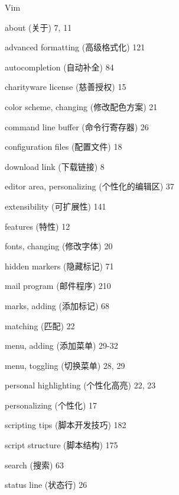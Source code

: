 \begin{multicols}{2}
\hangindent=2pc  Vim \par
\hangindent=2pc \quad about (关于) 7, 11 \par
\hangindent=2pc \quad advanced formatting (高级格式化) 121 \par
\hangindent=2pc \quad autocompletion (自动补全) 84 \par
\hangindent=2pc \quad charityware license (慈善授权) 15 \par
\hangindent=2pc \quad color scheme, changing (修改配色方案) 21 \par
\hangindent=2pc \quad command line buffer (命令行寄存器) 26 \par
\hangindent=2pc \quad configuration files (配置文件) 18 \par
\hangindent=2pc \quad download link (下载链接) 8 \par
\hangindent=2pc \quad editor area, personalizing (个性化的编辑区) 37 \par
\hangindent=2pc \quad extensibility (可扩展性) 141 \par
\hangindent=2pc \quad features (特性) 12 \par
\hangindent=2pc \quad fonts, changing (修改字体) 20 \par
\hangindent=2pc \quad hidden markers (隐藏标记) 71 \par
\hangindent=2pc \quad mail program (邮件程序) 210 \par
\hangindent=2pc \quad marks, adding (添加标记) 68 \par
\hangindent=2pc \quad matching (匹配) 22 \par
\hangindent=2pc \quad menu, adding (添加菜单) 29-32 \par
\hangindent=2pc \quad menu, toggling (切换菜单) 28, 29 \par
\hangindent=2pc \quad personal highlighting (个性化高亮) 22, 23 \par
\hangindent=2pc \quad personalizing (个性化) 17 \par
\hangindent=2pc \quad scripting tips (脚本开发技巧) 182 \par
\hangindent=2pc \quad script structure (脚本结构) 175 \par
\hangindent=2pc \quad search (搜索) 63 \par
\hangindent=2pc \quad status line (状态行) 26 \par

\end{multicols}
